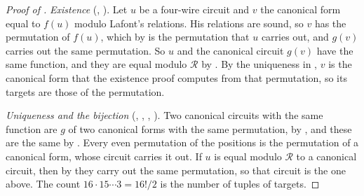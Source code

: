 \documentclass[acmsmall,screen,nonacm]{acmart}
\begin{document}
\begin{proof}[Proof of ]
\emph{Existence} \textup{(, )}. Let $u$ be a four-wire circuit and $v$ the canonical form equal to $f(u)$ modulo Lafont's relations. His relations are sound, so $v$ has the permutation of $f(u)$, which by  is the permutation that $u$ carries out, and $g(v)$ carries out the same permutation. So $u$ and the canonical circuit $g(v)$ have the same function, and they are equal modulo $\mathcal{R}$ by . By the uniqueness in , $v$ is the canonical form that the existence proof computes from that permutation, so its targets are those of the permutation.

\emph{Uniqueness and the bijection} \textup{(, , , )}. Two canonical circuits with the same function are $g$ of two canonical forms with the same permutation, by , and these are the same by . Every even permutation of the positions is the permutation of a canonical form, whose circuit carries it out. If $u$ is equal modulo $\mathcal{R}$ to a canonical circuit, then by  they carry out the same permutation, so that circuit is the one above. The count $16\cdot15\cdots3=16!/2$ is the number of tuples of targets.
\end{proof}
\end{document}

